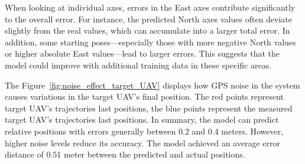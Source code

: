\par When looking at individual axes, errors in the East axes contribute significantly to the overall error. For instance, the predicted North axes values often deviate slightly from the real values, which can accumulate into a larger total error. In addition, some starting poses—especially those with more negative North values or higher absolute East values—lead to larger errors. This suggests that the model could improve with additional training data in these specific areas.



The Figure~\ref{fig:noise_effect_target_UAV} displays how GPS noise in the system causes variations in the target UAV’s final position. The red points represent target UAV's trajectories last positions, the blue points represent the measured target UAV's trajectories last positions. 
In summary, the model can predict relative positions  with errors generally between 0.2 and 0.4 meters. However, higher noise levels reduce its accuracy. The model achieved an average error distance of 0.51 meter between the predicted and actual
positions.
